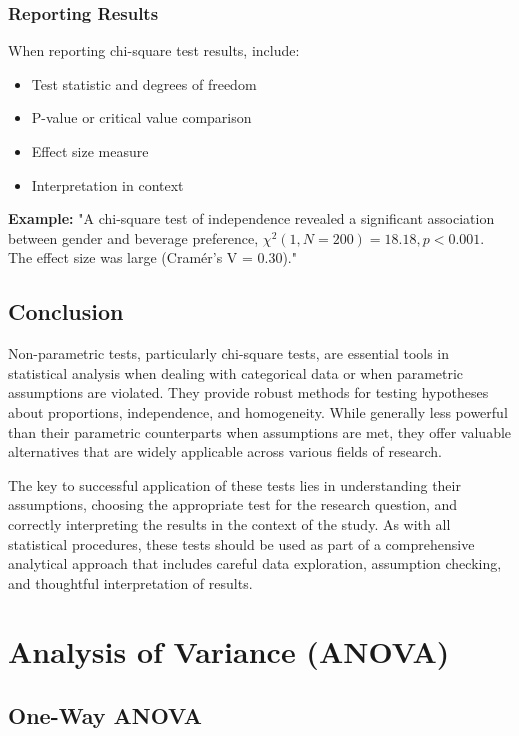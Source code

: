 \documentclass[twoside]{book}
\begin{document}
\subsection{Reporting Results}

When reporting chi-square test results, include:
\begin{itemize}
    \item Test statistic and degrees of freedom
    \item P-value or critical value comparison
    \item Effect size measure
    \item Interpretation in context
\end{itemize}

\textbf{Example:} "A chi-square test of independence revealed a significant association between gender and beverage preference, $\chi^2(1, N = 200) = 18.18, p < 0.001$. The effect size was large (Cramér's V = 0.30)."

\section{Conclusion}

Non-parametric tests, particularly chi-square tests, are essential tools in statistical analysis when dealing with categorical data or when parametric assumptions are violated. They provide robust methods for testing hypotheses about proportions, independence, and homogeneity. While generally less powerful than their parametric counterparts when assumptions are met, they offer valuable alternatives that are widely applicable across various fields of research.

The key to successful application of these tests lies in understanding their assumptions, choosing the appropriate test for the research question, and correctly interpreting the results in the context of the study. As with all statistical procedures, these tests should be used as part of a comprehensive analytical approach that includes careful data exploration, assumption checking, and thoughtful interpretation of results.


\chapter{Analysis of Variance (ANOVA)}

\section{One-Way ANOVA}
\end{document}
